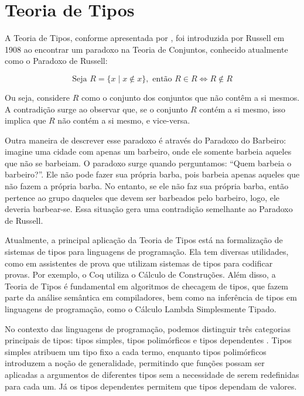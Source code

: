 \chapter{Teoria de Tipos} \label{ch:type-theory}

A Teoria de Tipos, conforme apresentada por \cite{COQUAND2022}, foi introduzida por Russell em 1908 ao encontrar um paradoxo na Teoria de Conjuntos, conhecido atualmente como o Paradoxo de Russell:

\begin{equation} \label{eq:russell-paradox}
  \text{Seja } R = \{ x \mid x \notin x \}, \text{ então } R \in R \iff R \notin R
\end{equation}

Ou seja, considere $R$ como o conjunto dos conjuntos que não contêm a si mesmos.
A contradição surge ao observar que, se o conjunto $R$ contém a si mesmo, isso implica que $R$ não contém a si mesmo, e vice-versa.

Outra maneira de descrever esse paradoxo é através do Paradoxo do Barbeiro: imagine uma cidade com apenas um barbeiro, onde ele somente barbeia aqueles que não se barbeiam.
O paradoxo surge quando perguntamos: ``Quem barbeia o barbeiro?''.
Ele não pode fazer sua própria barba, pois barbeia apenas aqueles que não fazem a própria barba.
No entanto, se ele não faz sua própria barba, então pertence ao grupo daqueles que devem ser barbeados pelo barbeiro, logo, ele deveria barbear-se.
Essa situação gera uma contradição semelhante ao Paradoxo de Russell.

Atualmente, a principal aplicação da Teoria de Tipos está na formalização de sistemas de tipos para linguagens de programação.
Ela tem diversas utilidades, como em assistentes de prova que utilizam sistemas de tipos para codificar provas.
Por exemplo, o Coq \cite{COQUAND1998} utiliza o Cálculo de Construções.
Além disso, a Teoria de Tipos é fundamental em algoritmos de checagem de tipos, que fazem parte da análise semântica em compiladores, bem como na inferência de tipos em linguagens de programação, como o Cálculo Lambda Simplesmente Tipado.

No contexto das linguagens de programação, podemos distinguir três categorias principais de tipos: tipos simples, tipos polimórficos e tipos dependentes \cite{PIERCE2002}.
Tipos simples atribuem um tipo fixo a cada termo, enquanto tipos polimórficos introduzem a noção de generalidade, permitindo que funções possam ser aplicadas a argumentos de diferentes tipos sem a necessidade de serem redefinidas para cada um.
Já os tipos dependentes permitem que tipos dependam de valores.

